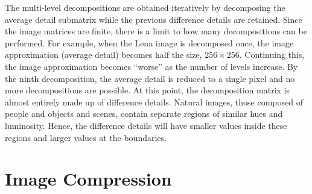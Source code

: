 \documentclass[12pt]{article}
\theoremstyle{definition}
\begin{document}
  The multi-level decompositions are obtained iteratively by decomposing the average detail submatrix while the previous difference details are retained.
  Since the image matrices are finite, there is a limit to how many decompositions can be performed. For example, when the Lena image is decomposed once, the image approximation (average detail) becomes half the size, \(256 \times 256\). Continuing this, the image approximation becomes ``worse'' as the number of levels increase. By the ninth decomposition, the average detail is reduced to a single pixel and no more decompositions are possible. At this point, the decomposition matrix is almost entirely made up of difference details. Natural images, those composed of people and objects and scenes, contain separate regions of similar hues and luminosity. Hence, the difference details will have smaller values inside these regions and larger values at the boundaries.


  

  \section{Image Compression}
\end{document}
